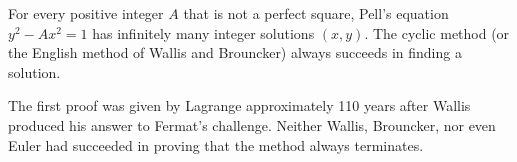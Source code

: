 For every positive integer $A$ that is not a perfect square, Pell's equation $y^2 - Ax^2 = 1$ has infinitely many integer solutions $(x, y)$. The cyclic method (or the English method of Wallis and Brouncker) always succeeds in finding a solution.

The first proof was given by Lagrange approximately 110 years after Wallis produced his answer to Fermat's challenge. Neither Wallis, Brouncker, nor even Euler had succeeded in proving that the method always terminates.

